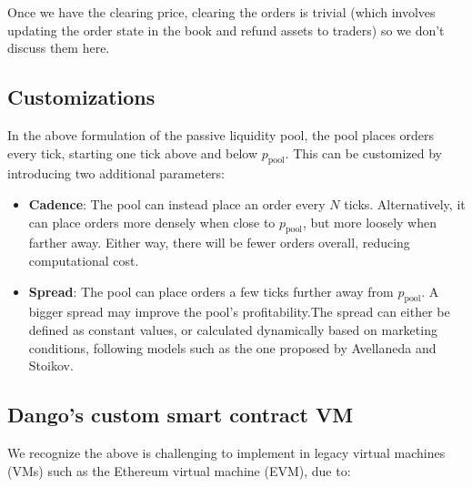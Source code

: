 \documentclass{article}
\begin{document}
Once we have the clearing price, clearing the orders is trivial (which involves updating the order state in the book and refund assets to traders) so we don't discuss them here.

\subsection{Customizations}

In the above formulation of the passive liquidity pool, the pool places orders every tick, starting one tick above and below $p_{\mathrm{pool}}$. This can be customized by introducing two additional parameters:

\begin{itemize}
  \item \textbf{Cadence}: The pool can instead place an order every $N$ ticks. Alternatively, it can place orders more densely when close to $p_{\mathrm{pool}}$, but more loosely when farther away. Either way, there will be fewer orders overall, reducing computational cost.
  \item \textbf{Spread}: The pool can place orders a few ticks further away from $p_{\mathrm{pool}}$. A bigger spread may improve the pool's profitability.The spread can either be defined as constant values, or calculated dynamically based on marketing conditions, following models such as the one proposed by Avellaneda and Stoikov.\supercite{avellanedastoikov}
\end{itemize}

\subsection{Dango's custom smart contract VM}

We recognize the above is challenging to implement in legacy virtual machines (VMs) such as the Ethereum virtual machine (EVM), due to:
\end{document}
